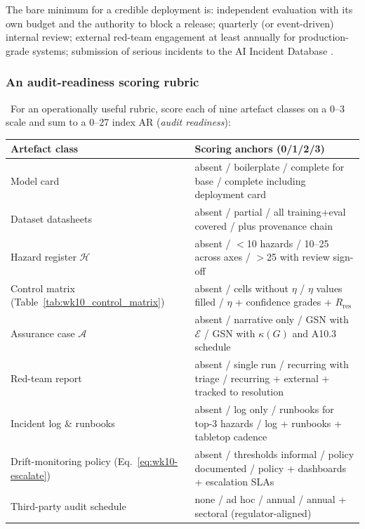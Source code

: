 The bare minimum for a credible deployment is: independent
evaluation with its own budget and the authority to block a
release; quarterly (or event-driven) internal review; external
red-team engagement at least annually for production-grade
systems; submission of serious incidents to the AI Incident
Database \citep{aiid}.

\subsubsection{An audit-readiness scoring rubric}
\label{sec:wk10_audit_rubric}

\Def\ For an operationally useful rubric, score each of nine
artefact classes on a 0--3 scale and sum to a 0--27 index
$\mathrm{AR}$ (\emph{audit readiness}):

\begin{center}
\small
\begin{tabular}{p{4.3cm} p{9.5cm}}
\toprule
\textbf{Artefact class} & \textbf{Scoring anchors (0/1/2/3)} \\
\midrule
Model card
  & absent / boilerplate / complete for base
    / complete including deployment card \\
Dataset datasheets
  & absent / partial / all training+eval covered
    / plus provenance chain \\
Hazard register $\mathcal{H}$
  & absent / $<$10 hazards / 10--25 across axes
    / $>$25 with review sign-off \\
Control matrix (Table~\ref{tab:wk10_control_matrix})
  & absent / cells without $\eta$
    / $\eta$ values filled
    / $\eta$ + confidence grades + $R_\mathrm{res}$ \\
Assurance case $\mathcal{A}$
  & absent / narrative only / GSN with $\mathcal{E}$
    / GSN with $\kappa(G)$ and A10.3 schedule \\
Red-team report
  & absent / single run / recurring with triage
    / recurring + external + tracked to resolution \\
Incident log \& runbooks
  & absent / log only / runbooks for top-3 hazards
    / log + runbooks + tabletop cadence \\
Drift-monitoring policy (Eq.~\eqref{eq:wk10-escalate})
  & absent / thresholds informal / policy documented
    / policy + dashboards + escalation SLAs \\
Third-party audit schedule
  & none / ad hoc / annual / annual + sectoral
    (regulator-aligned) \\
\bottomrule
\end{tabular}
\end{center}

